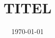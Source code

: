 


\title{TITEL}
\date{%
 \today %
}



\maketitle
\thispagestyle{empty}
\tableofcontents
\newpage






\printbibliography{}


